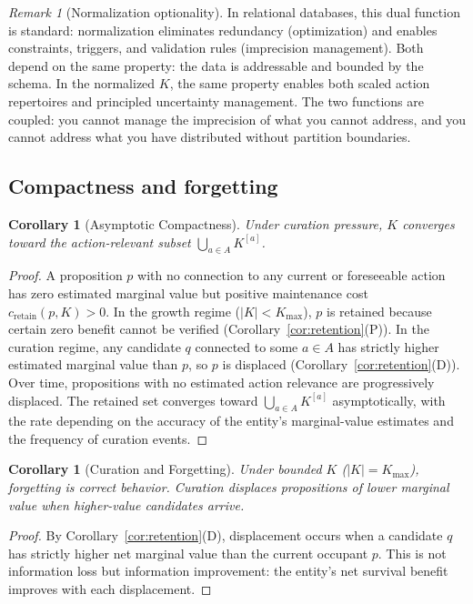 \documentclass[11pt]{article}
\newtheorem{corollary}[theorem]{Corollary}
\theoremstyle{definition}
\theoremstyle{remark}
\newtheorem*{remark}{Remark}
\begin{document}
\begin{remark}[Normalization optionality]
In relational databases, this dual function is standard: normalization
eliminates redundancy (optimization) and enables constraints, triggers,
and validation rules (imprecision management). Both depend on the same
property: the data is addressable and bounded by the schema. In the
normalized $K$, the same property enables both scaled action
repertoires and principled uncertainty management. The two functions
are coupled: you cannot manage the imprecision of what you cannot
address, and you cannot address what you have distributed without
partition boundaries.
\end{remark}

\subsection{Compactness and forgetting}

\begin{corollary}[Asymptotic Compactness]
\label{cor:compactness}
Under curation pressure, $K$ converges toward the action-relevant
subset $\bigcup_{a \in A} K^{[a]}$.
\end{corollary}

\begin{proof}
A proposition $p$ with no connection to any current or foreseeable
action has zero estimated marginal value but positive maintenance cost
$c_{\text{retain}}(p, K) > 0$. In the growth regime ($|K| < K_{\max}$),
$p$ is retained because certain zero benefit cannot be verified
(Corollary~\ref{cor:retention}(P)). In the curation regime, any
candidate $q$ connected to some $a \in A$ has strictly higher estimated
marginal value than $p$, so $p$ is displaced
(Corollary~\ref{cor:retention}(D)). Over time, propositions with no
estimated action relevance are progressively displaced. The retained set
converges toward $\bigcup_{a \in A} K^{[a]}$ asymptotically, with the
rate depending on the accuracy of the entity's marginal-value estimates
and the frequency of curation events.
\end{proof}

\begin{corollary}[Curation and Forgetting]
\label{cor:forgetting}
Under bounded $K$ ($|K| = K_{\max}$), forgetting is correct behavior.
Curation displaces propositions of lower marginal value when higher-value
candidates arrive.
\end{corollary}

\begin{proof}
By Corollary~\ref{cor:retention}(D), displacement occurs when a
candidate $q$ has strictly higher net marginal value than the current
occupant $p$. This is not information loss but information improvement:
the entity's net survival benefit improves with each displacement.
\end{proof}
\end{document}
